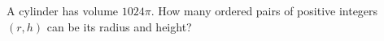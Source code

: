 A cylinder has volume $1024\pi$. How many ordered pairs of positive integers $(r,h)$ can be its radius and height?
